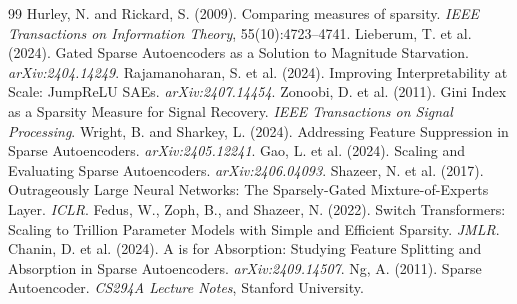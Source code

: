 \documentclass[11pt,twocolumn]{article}
\begin{document}
\begin{thebibliography}{99}
 Hurley, N. and Rickard, S. (2009). Comparing measures of sparsity. \textit{IEEE Transactions on Information Theory}, 55(10):4723--4741.
 Lieberum, T. et al. (2024). Gated Sparse Autoencoders as a Solution to Magnitude Starvation. \textit{arXiv:2404.14249}.
 Rajamanoharan, S. et al. (2024). Improving Interpretability at Scale: JumpReLU SAEs. \textit{arXiv:2407.14454}.
 Zonoobi, D. et al. (2011). Gini Index as a Sparsity Measure for Signal Recovery. \textit{IEEE Transactions on Signal Processing}.
 Wright, B. and Sharkey, L. (2024). Addressing Feature Suppression in Sparse Autoencoders. \textit{arXiv:2405.12241}.
 Gao, L. et al. (2024). Scaling and Evaluating Sparse Autoencoders. \textit{arXiv:2406.04093}.
 Shazeer, N. et al. (2017). Outrageously Large Neural Networks: The Sparsely-Gated Mixture-of-Experts Layer. \textit{ICLR}.
 Fedus, W., Zoph, B., and Shazeer, N. (2022). Switch Transformers: Scaling to Trillion Parameter Models with Simple and Efficient Sparsity. \textit{JMLR}.
 Chanin, D. et al. (2024). A is for Absorption: Studying Feature Splitting and Absorption in Sparse Autoencoders. \textit{arXiv:2409.14507}.
 Ng, A. (2011). Sparse Autoencoder. \textit{CS294A Lecture Notes}, Stanford University.
\end{thebibliography}
\end{document}

